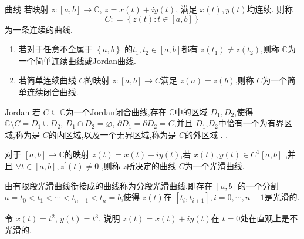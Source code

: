 \documentclass[../../复变函数.tex]{subfiles}
\begin{document}
\begin{definition}{曲线}
    若映射 \(  z:[a,b]\to \mathbb{C}   \), \(  z =  x\left( t \right)+ i y\left( t \right)    \),  满足 \(  x\left( t \right),y\left( t \right)    \)均连续.
    则称 \[
    C : =  \left\{ z\left( t \right): t \in [a,b]  \right\}
    \] 为一条连续的曲线.
\end{definition}

\begin{remark}
    \begin{enumerate}
        \item 若对于任意不全属于 \(  \left\{ a,b \right\}  \) 的\(    t_1,t_2 \in [a,b]  \)都有 \(  z\left( t_1 \right)\neq z\left( t_2 \right)    \),则称 \(  \mathbb{C}   \)为一个简单连续曲线或Jordan曲线.
        \item 若简单连续曲线 \(  C  \)的映射 \(  z:[a,b]\to C  \)满足 \(  z\left( a \right)= z\left( b \right)    \),则称 \(  C  \)为一个简单连续闭合曲线.    
    \end{enumerate}
    
\end{remark}

\begin{theorem}{Jordan}
    若 \(  C\subseteq \mathbb{C}   \)为一个Jordan闭合曲线,存在 \(  \mathbb{C}   \)中的区域  \(  D_1,D_2  \),使得 \(  \mathbb{C} \setminus C= D_1\cup D_2  \), \(  D_1\cap D_2 =  \varnothing  \), \(  \partial D_1= \partial D_2= C  \),并且 \(  D_1  \),\(  D_2  \)中恰有一个为有界区域,称为是 \(  C  \)的内区域,以及一个无界区域,称为是 \(  C  \)的外区域 .    .     
\end{theorem}

\begin{definition}
    对于 \(  [a,b]\to \mathbb{C}   \)的映射 \(  z\left( t \right)= x\left( t \right)+ i y\left( t \right)     \),若 \(  x\left( t \right),y\left( t \right) \in C^{1}[a,b]    \)   ,并且 \(  \forall  t \in [a,b],   z^{\prime} \left( t \right)\neq 0      \) ,则称 \(  z  \)所决定的曲线 \(  C  \)为一个光滑曲线.  
\end{definition}
\begin{remark}
    由有限段光滑曲线衔接成的曲线称为分段光滑曲线.即存在 \(  [a,b]  \)的一个分割 \(  a=  t_0<t_1<\cdots < t_{n-1}< t_{n}= b  \),使得 \(  z\left( t \right)   \)在 \(  [t_{i},t_{i+ 1}]  , i = 0,\cdots ,n-1\)是光滑的.  
\end{remark}
\begin{exercise}
    令 \(  x \left( t \right)= t^{2}   \), \(  y\left( t \right)= t^{3}   \), 说明 \(  z \left( t \right)= x\left( t \right)+ i y\left( t \right)     \)在 \(  t= 0  \)处在直观上是不光滑的.    
\end{exercise}
\end{document}
